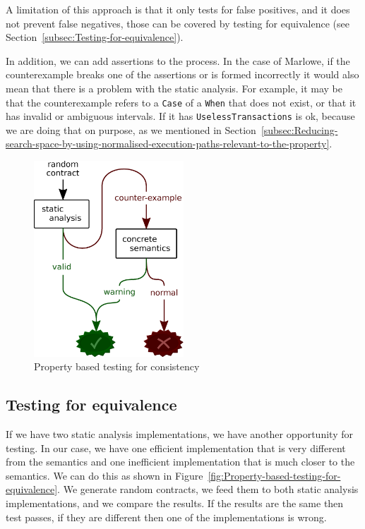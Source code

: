 \documentclass[english,runningheads]{llncs}
\begin{document}
A limitation of this approach is that it only tests for false positives,
and it does not prevent false negatives, those can be covered by testing
for equivalence (see Section~\ref{subsec:Testing-for-equivalence}).

In addition, we can add assertions to the process. In the case of
Marlowe, if the counterexample breaks one of the assertions or is
formed incorrectly it would also mean that there is a problem with
the static analysis. For example, it may be that the counterexample
refers to a \texttt{Case} of a \texttt{When} that does not exist,
or that it has invalid or ambiguous intervals. If it has \texttt{UselessTransactions}
is ok, because we are doing that on purpose, as we mentioned in Section~\ref{subsec:Reducing-search-space-by-using-normalised-execution-paths-relevant-to-the-property}.

\begin{figure}
\begin{centering}
\includegraphics[width=0.5\textwidth]{figures/consistency_property}
\par\end{centering}
\caption{Property based testing for consistency\label{fig:Property-based-testing-for-consistency}}

\end{figure}


\subsection{Testing for equivalence\label{subsec:Testing-for-equivalence} }

If we have two static analysis implementations, we have another opportunity
for testing. In our case, we have one efficient implementation that
is very different from the semantics and one inefficient implementation
that is much closer to the semantics. We can do this as shown in Figure~\ref{fig:Property-based-testing-for-equivalence}.
We generate random contracts, we feed them to both static analysis
implementations, and we compare the results. If the results are the
same then test passes, if they are different then one of the implementations
is wrong.
\end{document}
